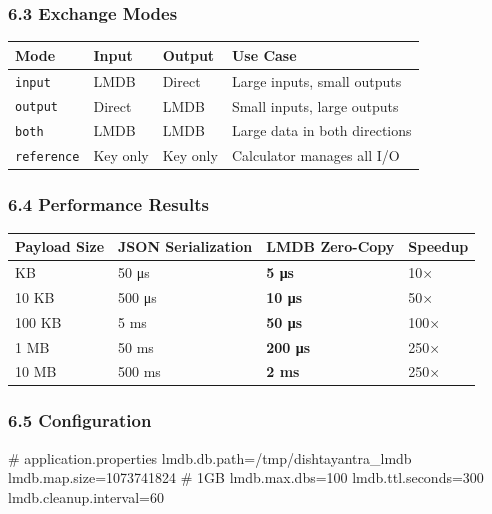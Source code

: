\documentclass[
]{article}
\newenvironment{Shaded}{}{}
\newcommand{\NormalTok}[1]{#1}
\begin{document}
\hypertarget{exchange-modes}{%
\subsubsection{6.3 Exchange Modes}\label{exchange-modes}}

\begin{longtable}[]{@{}llll@{}}
\toprule\noalign{}
Mode & Input & Output & Use Case \\
\midrule\noalign{}
\endhead
\bottomrule\noalign{}
\endlastfoot
\texttt{input} & LMDB & Direct & Large inputs, small outputs \\
\texttt{output} & Direct & LMDB & Small inputs, large outputs \\
\texttt{both} & LMDB & LMDB & Large data in both directions \\
\texttt{reference} & Key only & Key only & Calculator manages all I/O \\
\end{longtable}

\hypertarget{performance-results}{%
\subsubsection{6.4 Performance Results}\label{performance-results}}

\begin{longtable}[]{@{}llll@{}}
\toprule\noalign{}
Payload Size & JSON Serialization & LMDB Zero-Copy & Speedup \\
\midrule\noalign{}
\endhead
\bottomrule\noalign{}
\endlastfoot
1 KB & 50 μs & \textbf{5 μs} & 10× \\
10 KB & 500 μs & \textbf{10 μs} & 50× \\
100 KB & 5 ms & \textbf{50 μs} & 100× \\
1 MB & 50 ms & \textbf{200 μs} & 250× \\
10 MB & 500 ms & \textbf{2 ms} & 250× \\
\end{longtable}

\hypertarget{configuration}{%
\subsubsection{6.5 Configuration}\label{configuration}}

\begin{Shaded}
\begin{Highlighting}[]
\NormalTok{\# application.properties}
\NormalTok{lmdb.db.path=/tmp/dishtayantra\_lmdb}
\NormalTok{lmdb.map.size=1073741824          \# 1GB}
\NormalTok{lmdb.max.dbs=100}
\NormalTok{lmdb.ttl.seconds=300}
\NormalTok{lmdb.cleanup.interval=60}
\end{Highlighting}
\end{Shaded}
\end{document}

